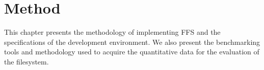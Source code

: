 
\chapter{Method}
\label{ch:methods}

This chapter presents the methodology of implementing FFS and the specifications of the development environment. We also present the benchmarking tools and methodology used to acquire the quantitative data for the evaluation of the filesystem.





